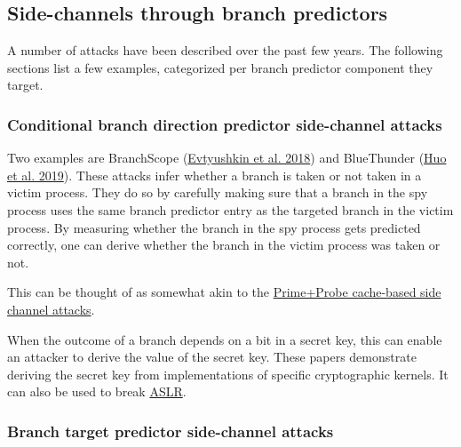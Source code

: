 \documentclass[
  a4paper,
]{report}
\begin{document}
\hypertarget{side-channels-through-branch-predictors}{%
\subsection{Side-channels through branch
predictors}\label{side-channels-through-branch-predictors}}

A number of attacks have been described over the past few years. The
following sections list a few examples, categorized per branch predictor
component they target.

\hypertarget{conditional-branch-direction-predictor-side-channel-attacks}{%
\subsubsection{Conditional branch direction predictor side-channel
attacks}\label{conditional-branch-direction-predictor-side-channel-attacks}}


Two examples are BranchScope
(\protect\hyperlink{ref-Evtyushkin2018}{Evtyushkin et al.
2018}) and BlueThunder
(\protect\hyperlink{ref-Huo2019}{Huo et al. 2019}).
These attacks infer whether a branch is taken or not taken in a victim
process. They do so by carefully making sure that a branch in the spy
process uses the same branch predictor entry as the targeted branch in
the victim process. By measuring whether the branch in the spy process
gets predicted correctly, one can derive whether the branch in the
victim process was taken or not.

This can be thought of as somewhat akin to the
\protect\hyperlink{primeprobe}{Prime+Probe cache-based side channel
attacks}.

When the outcome of a branch depends on a bit in a secret key, this can
enable an attacker to derive the value of the secret key. These papers
demonstrate deriving the secret key from implementations of specific
cryptographic kernels. It can also be used to break
\protect\hyperlink{aslr}{ASLR}.

\hypertarget{branch-target-predictor-side-channel-attacks}{%
\subsubsection{Branch target predictor side-channel
attacks}\label{branch-target-predictor-side-channel-attacks}}

\end{document}
